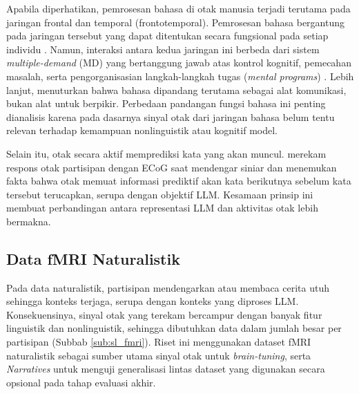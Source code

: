 Apabila diperhatikan, pemrosesan bahasa di otak manusia terjadi terutama pada jaringan frontal dan temporal (frontotemporal). Pemrosesan bahasa bergantung pada jaringan tersebut yang dapat ditentukan secara fungsional pada setiap individu \autocite{fedorenko2010new}. Namun, interaksi antara kedua jaringan ini berbeda dari sistem \textit{multiple-demand} (MD) yang bertanggung jawab atas kontrol kognitif, pemecahan masalah, serta pengorganisasian langkah-langkah tugas (\textit{mental programs}) \autocite{duncan2010multiple}. Lebih lanjut, \textcite{fedorenko2024language} menuturkan bahwa bahasa dipandang terutama sebagai alat komunikasi, bukan alat untuk berpikir. Perbedaan pandangan fungsi bahasa ini penting dianalisis karena pada dasarnya sinyal otak dari jaringan bahasa belum tentu relevan terhadap kemampuan nonlinguistik atau kognitif model.

Selain itu, otak secara aktif memprediksi kata yang akan muncul. \textcite{goldstein2022shared} merekam respons otak partisipan dengan ECoG saat mendengar siniar dan menemukan fakta bahwa otak memuat informasi prediktif akan kata berikutnya sebelum kata tersebut terucapkan, serupa dengan objektif LLM. Kesamaan prinsip ini membuat perbandingan antara representasi LLM dan aktivitas otak lebih bermakna. %

\subsection{Data fMRI Naturalistik}
\label{sub:sl_naturalistik}

Pada data naturalistik, partisipan mendengarkan atau membaca cerita utuh sehingga konteks terjaga, serupa dengan konteks yang diproses LLM. Konsekuensinya, sinyal otak yang terekam bercampur dengan banyak fitur linguistik dan nonlinguistik, sehingga dibutuhkan data dalam jumlah besar per partisipan (Subbab \ref{sub:sl_fmri}). Riset ini menggunakan dataset fMRI naturalistik \autocite{lebel2023natural} sebagai sumber utama sinyal otak untuk \textit{brain-tuning}, serta \textit{Narratives} \autocite{nastase2021narratives} untuk menguji generalisasi lintas dataset yang digunakan secara opsional pada tahap evaluasi akhir. %

